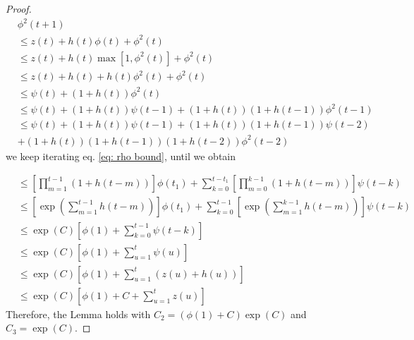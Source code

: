 \documentclass[twoside,11pt,english]{article}
\begin{document}
{\begin{proof}
\begin{align*}
 & \phi^{2}\left(t+1\right)\\
 & \leq z\left(t\right)+h\left(t\right)\phi\left(t\right)+\phi^{2}\left(t\right)\\
 & \leq z\left(t\right)+h\left(t\right)\max\left[1,\phi^{2}\left(t\right)\right]+\phi^{2}\left(t\right)\\
 & \leq z\left(t\right)+h\left(t\right)+h\left(t\right)\phi^{2}\left(t\right)+\phi^{2}\left(t\right)\\
 & \leq\psi\left(t\right)+\left(1+h\left(t\right)\right)\phi^{2}\left(t\right)\\
 & \leq\psi\left(t\right)+\left(1+h\left(t\right)\right)\psi\left(t-1\right)+\left(1+h\left(t\right)\right)\left(1+h\left(t-1\right)\right)\phi^{2}\left(t-1\right)\\
 & \leq\psi\left(t\right)+\left(1+h\left(t\right)\right)\psi\left(t-1\right)+\left(1+h\left(t\right)\right)\left(1+h\left(t-1\right)\right)\psi\left(t-2\right)\\
 & +\left(1+h\left(t\right)\right)\left(1+h\left(t-1\right)\right)\left(1+h\left(t-2\right)\right)\phi^{2}\left(t-2\right)
\end{align*}
we keep iterating eq. \ref{eq: rho bound}, until we obtain

\begin{align*}
 & \leq\left[\prod_{m=1}^{t-1}\left(1+h\left(t-m\right)\right)\right]\phi\left(t_{1}\right)+\sum_{k=0}^{t-t_{1}}\left[\prod_{m=0}^{k-1}\left(1+h\left(t-m\right)\right)\right]\psi\left(t-k\right)\\
 & \leq\left[\exp\left(\sum_{m=1}^{t-1}h\left(t-m\right)\right)\right]\phi\left(t_{1}\right)+\sum_{k=0}^{t-1}\left[\exp\left(\sum_{m=1}^{k-1}h\left(t-m\right)\right)\right]\psi\left(t-k\right)\\
 & \leq\exp\left(C\right)\left[\phi\left(1\right)+\sum_{k=0}^{t-1}\psi\left(t-k\right)\right]\\
 & \leq\exp\left(C\right)\left[\phi\left(1\right)+\sum_{u=1}^{t}\psi\left(u\right)\right]\\
 & \leq\exp\left(C\right)\left[\phi\left(1\right)+\sum_{u=1}^{t}\left(z\left(u\right)+h\left(u\right)\right)\right]\\
 & \leq\exp\left(C\right)\left[\phi\left(1\right)+C+\sum_{u=1}^{t}z\left(u\right)\right]
\end{align*}
Therefore, the Lemma holds with $C_{2}=\left(\phi\left(1\right)+C\right)\exp\left(C\right)$
and $C_{3}=\exp\left(C\right)$.
\end{proof}
}
\end{document}
